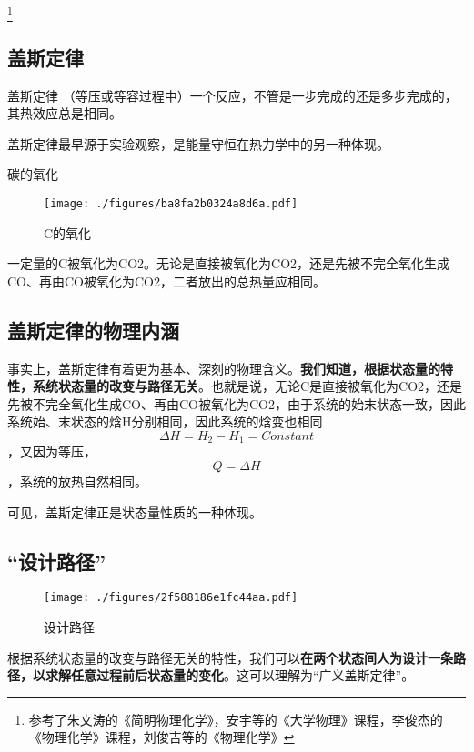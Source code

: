 

\footnote{参考了朱文涛的《简明物理化学》，安宇等的《大学物理》课程，李俊杰的《物理化学》课程，刘俊吉等的《物理化学》}

\subsection{盖斯定律}
\begin{theorem}{盖斯定律}
（等压或等容过程中）一个反应，不管是一步完成的还是多步完成的，其热效应总是相同。
\end{theorem}
盖斯定律最早源于实验观察，是能量守恒在热力学中的另一种体现。

\begin{example}{碳的氧化}
\begin{figure}[ht]
\centering
\texttt{[image: ./figures/ba8fa2b0324a8d6a.pdf]}
\caption{C的氧化} \label{fig_Hess_2}
\end{figure}
一定量的C被氧化为CO2。无论是直接被氧化为CO2，还是先被不完全氧化生成CO、再由CO被氧化为CO2，二者放出的总热量应相同。
\end{example}

\subsection{盖斯定律的物理内涵}
事实上，盖斯定律有着更为基本、深刻的物理含义。\textbf{我们知道，根据状态量的特性，系统状态量的改变与路径无关}。也就是说，无论C是直接被氧化为CO2，还是先被不完全氧化生成CO、再由CO被氧化为CO2，由于系统的始末状态一致，因此系统始、末状态的焓H分别相同，因此系统的焓变也相同$$\Delta H=H_2-H_1=Constant$$，又因为等压，$$Q=\Delta H$$，系统的放热自然相同。

可见，盖斯定律正是状态量性质的一种体现。

\subsection{“设计路径”}
\begin{figure}[ht]
\centering
\texttt{[image: ./figures/2f588186e1fc44aa.pdf]}
\caption{设计路径} \label{fig_Hess_1}
\end{figure}

根据系统状态量的改变与路径无关的特性，我们可以\textbf{在两个状态间人为设计一条路径，以求解任意过程前后状态量的变化}。这可以理解为“广义盖斯定律”。

